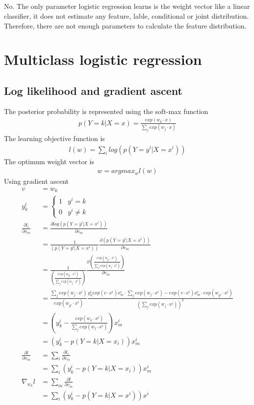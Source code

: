 \documentclass[12pt]{article}
\begin{document}
\subsection{}
No. The only parameter logistic regression learns is the weight vector like a linear classifier, it does not estimate any feature, lable, conditional or joint distribution. Therefore, there are not enough parameters to calculate the feature distribution.

\section{Multiclass logistic regression}
\subsection{Log likelihood and gradient ascent}
The posterior probability is represented using the soft-max function
\begin{align*}
p(Y=k|X=x) = \frac{exp(w_k \cdot x)} { \sum_j exp(w_j \cdot x)}
\end{align*}
The learning objective function is
\begin{align*}
l(w) = \sum_i log (p(Y=y^i|X=x^i))
\end{align*}
The optimum weight vector is
\begin{align*}
w = argmax_w l(w)
\end{align*}
Using gradient ascent
\begin{align*}
  v
  &= w_k \\
  y_k^i &=
  \begin{cases}
    1 & y^i = k \\
    0 & y^i \neq k
  \end{cases} \\
  \frac {\partial l_i} {\partial v_m}
  &= \frac {\partial log (p(Y=y^i|X=x^i))}{\partial v_m} \\
  &= \frac{1}{(p(Y=y^i|X=x^i))} \frac {\partial (p(Y=y^i|X=x^i))}{\partial v_m} \\
  &= \frac{1}{(\frac{exp(w_{y^i} \cdot {x^i})} { \sum_j exp(w_j \cdot {x^i})})} \frac {\partial (\frac{exp(w_{y^i} \cdot {x^i})} { \sum_j exp(w_j \cdot {x^i})})}{\partial v_m} \\
  &= {\frac{ \sum_j exp(w_j \cdot {x^i})} {exp(w_{y^i} \cdot {x^i})} } \frac {y_k^i exp(v \cdot x^i) x_m^i \cdot {\sum_j exp(w_j \cdot {x^i})} - exp(v \cdot x^i) x_m^i \cdot {exp(w_{y^i} \cdot {x^i})}} {({\sum_j exp(w_j \cdot {x^i})})^2} \\
  &= (y_k^i - \frac{exp(w_k \cdot x^i)} { \sum_j exp(w_j \cdot x^i)}) x_m^i \\
  &= (y_k^i - p(Y=k|X=x_i)) x_m^i \\
  \frac {\partial l} {\partial v_m}
  &= \sum_i \frac {\partial l_i} {\partial v_m} \\
  &= \sum_i (y_k^i - p(Y=k|X=x_i)) x_m^i \\
  \nabla_{w_k} l
  &= \sum_m \frac{\partial l}{\partial {v_m}} \\
  &= \sum_i (y_k^i - p(Y=k|X=x^i))x^i \\
\end{align*}
\end{document}
